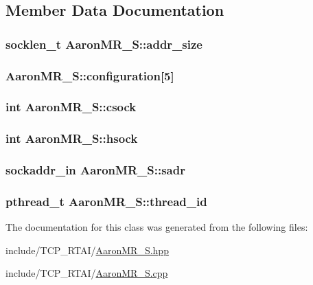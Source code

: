 \subsection{Member Data Documentation}
\hypertarget{classAaronMR__S_ac76a524ef01d6ad627cf75d0a0ac1a23}{
\subsubsection[{addr\_\-size}]{\setlength{\rightskip}{0pt plus 5cm}socklen\_\-t {\bf AaronMR\_\-S::addr\_\-size}}}
\label{classAaronMR__S_ac76a524ef01d6ad627cf75d0a0ac1a23}
\hypertarget{classAaronMR__S_ae216ad357a36cfd9c656ea24f500ea47}{
\subsubsection[{configuration}]{ {\bf AaronMR\_\-S::configuration}\mbox{[}5\mbox{]}}}
\label{classAaronMR__S_ae216ad357a36cfd9c656ea24f500ea47}
\hypertarget{classAaronMR__S_a03edb63f6a885fa9bb6746be9692fe23}{
\subsubsection[{csock}]{\setlength{\rightskip}{0pt plus 5cm}int {\bf AaronMR\_\-S::csock}}}
\label{classAaronMR__S_a03edb63f6a885fa9bb6746be9692fe23}
\hypertarget{classAaronMR__S_ab5a2d2bd18b9d5d89a2461db95b25447}{
\subsubsection[{hsock}]{\setlength{\rightskip}{0pt plus 5cm}int {\bf AaronMR\_\-S::hsock}}}
\label{classAaronMR__S_ab5a2d2bd18b9d5d89a2461db95b25447}
\hypertarget{classAaronMR__S_a4042c0d819c65c5d5e4d2e466b08af05}{
\subsubsection[{sadr}]{\setlength{\rightskip}{0pt plus 5cm}sockaddr\_\-in {\bf AaronMR\_\-S::sadr}}}
\label{classAaronMR__S_a4042c0d819c65c5d5e4d2e466b08af05}
\hypertarget{classAaronMR__S_a58140066fda1aa3675f4458ab992f868}{
\subsubsection[{thread\_\-id}]{\setlength{\rightskip}{0pt plus 5cm}pthread\_\-t {\bf AaronMR\_\-S::thread\_\-id}}}
\label{classAaronMR__S_a58140066fda1aa3675f4458ab992f868}


The documentation for this class was generated from the following files:\begin{DoxyCompactItemize}
\item 
include/TCP\_\-RTAI/\hyperlink{AaronMR__S_8hpp}{AaronMR\_\-S.hpp}\item 
include/TCP\_\-RTAI/\hyperlink{AaronMR__S_8cpp}{AaronMR\_\-S.cpp}\end{DoxyCompactItemize}
